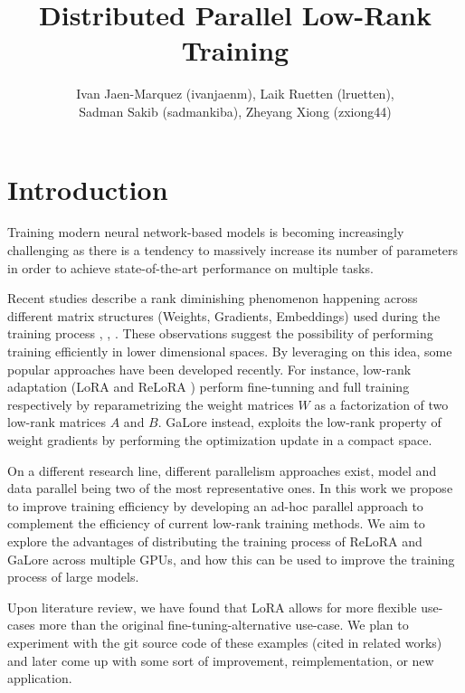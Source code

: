 \documentclass[pdftex,twocolumn,10pt,letterpaper]{article}
\begin{document}
\title{Distributed Parallel Low-Rank Training}
\author{Ivan Jaen-Marquez (ivanjaenm), Laik Ruetten (lruetten), \\ Sadman Sakib (sadmankiba), Zheyang Xiong (zxiong44)}

\date{}


\maketitle

\section{Introduction}

Training modern neural network-based models is becoming increasingly challenging as there is a tendency to massively increase its number of parameters in order to achieve state-of-the-art performance on multiple tasks.

Recent studies describe a rank diminishing phenomenon happening across different matrix structures (Weights, Gradients, Embeddings) used during the training process \cite{huh2023simplicitybias}, \cite{9782552}, \cite{le2022training}. These observations suggest the possibility of performing training efficiently in lower dimensional spaces. By leveraging on this idea, some popular approaches have been developed recently. For instance, low-rank adaptation (LoRA  \cite{Hu2021LoRA} and ReLoRA \cite{lialin2023relora}) perform fine-tunning and full training respectively by reparametrizing the weight matrices $W$ as a factorization of two low-rank matrices $A$ and $B$. GaLore \cite{zhao2024galore}  instead, exploits the low-rank property of weight gradients by performing the optimization update in a compact space.

On a different research line, different parallelism approaches exist, model and data parallel being two of the most representative ones. In this work we propose to improve training efficiency by developing an ad-hoc parallel approach to complement the efficiency of current low-rank training methods. We aim to explore the advantages of distributing the training process of ReLoRA and GaLore across multiple GPUs, and how this can be used to improve the training process of large models.

Upon literature review, we have found that LoRA allows for more flexible use-cases more than the original fine-tuning-alternative use-case. We plan to experiment with the git source code of these examples (cited in related works) and later come up with some sort of improvement, reimplementation, or new application.
\end{document}
